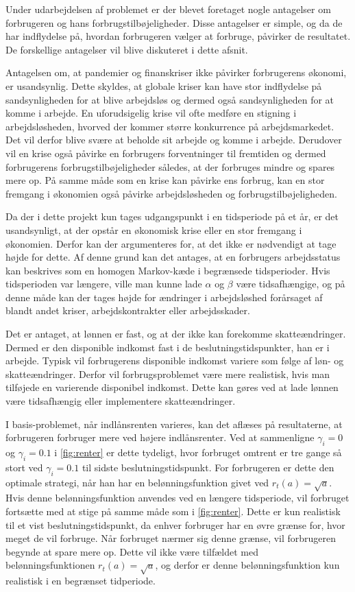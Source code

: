 Under udarbejdelsen af problemet er der blevet foretaget nogle antagelser om forbrugeren og hans forbrugstilbøjeligheder. Disse antagelser er simple, og da de har indflydelse på, hvordan forbrugeren vælger at forbruge, påvirker de resultatet. De forskellige antagelser vil blive diskuteret i dette afsnit.

Antagelsen om, at pandemier og finanskriser ikke påvirker forbrugerens økonomi, er usandsynlig. Dette skyldes, at globale kriser kan have stor indflydelse på sandsynligheden for at blive arbejdsløs og dermed også sandsynligheden for at komme i arbejde. En uforudsigelig krise vil ofte medføre en stigning i arbejdsløsheden, hvorved der kommer større konkurrence på arbejdsmarkedet. Det vil derfor blive svære at beholde sit arbejde og komme i arbejde. Derudover vil en krise også påvirke en forbrugers forventninger til fremtiden og dermed forbrugerens forbrugstilbøjeligheder således, at der forbruges mindre og spares mere op. På samme måde som en krise kan påvirke ens forbrug, kan en stor fremgang i økonomien også påvirke arbejdsløsheden og forbrugstilbøjeligheden. 

Da der i dette projekt kun tages udgangspunkt i en tidsperiode på et år, er det usandsynligt, at der opstår en økonomisk krise eller en stor fremgang i økonomien. Derfor kan der argumenteres for, at det ikke er nødvendigt at tage højde for dette. Af denne grund kan det antages, at en forbrugers arbejdsstatus kan beskrives som en homogen Markov-kæde i begrænsede tidsperioder. Hvis tidsperioden var længere, ville man kunne lade $\alpha$ og $\beta$ være tidsafhængige, og på denne måde kan der tages højde for ændringer i arbejdsløshed forårsaget af blandt andet kriser, arbejdskontrakter eller arbejdsskader.

Det er antaget, at lønnen er fast, og at der ikke kan forekomme skatteændringer. Dermed er den disponible indkomst fast i de beslutningstidspunkter, han er i arbejde. Typisk vil forbrugerens disponible indkomst variere som følge af løn- og skatteændringer. Derfor vil forbrugsproblemet være mere realistisk, hvis man tilføjede en varierende disponibel indkomst. Dette kan gøres ved at lade lønnen være tidsafhængig eller implementere skatteændringer.

I basis-problemet, når indlånsrenten varieres, kan det aflæses på resultaterne, at forbrugeren forbruger mere ved højere indlånsrenter. Ved at sammenligne $\gamma_i=0$ og $\gamma_i=0.1$ i \autoref{fig:renter} er dette tydeligt, hvor forbruget omtrent er tre gange så stort ved $\gamma_i = 0.1$ til sidste beslutningstidspunkt. For forbrugeren er dette den optimale strategi, når han har en belønningsfunktion givet ved $r_t(a) = \sqrt{a}$. Hvis denne belønningsfunktion anvendes ved en længere tidsperiode, vil forbruget fortsætte med at stige på samme måde som i \autoref{fig:renter}. Dette er kun realistisk til et vist beslutningstidspunkt, da enhver forbruger har en øvre grænse for, hvor meget de vil forbruge. Når forbruget nærmer sig denne grænse, vil forbrugeren begynde at spare mere op. Dette vil ikke være tilfældet med belønningsfunktionen $r_t(a) = \sqrt{a}$, og derfor er denne belønningsfunktion kun realistisk i en begrænset tidperiode.

